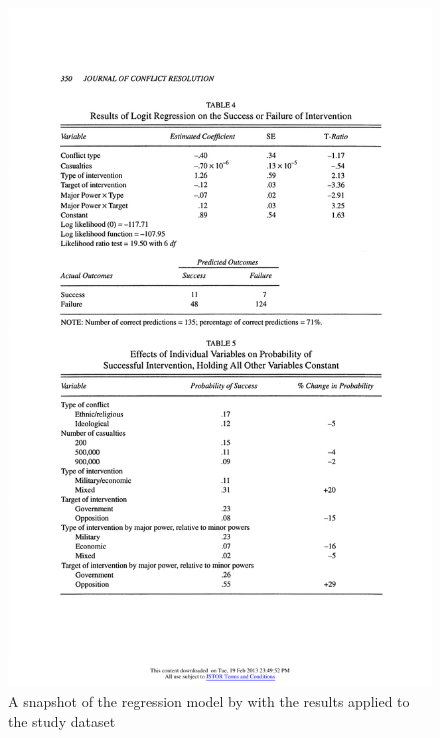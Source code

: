 \documentclass[letterpaper,12pt,titlepage,oneside,final]{book}
\begin{document}
\begin{center}
\begin{figure}[H]
\centering
\includegraphics[scale=1]{PDF-IMG/Regan_snap.pdf}

\caption{A snapshot of the regression model by \citet{regan1996} with the results applied to the study dataset}

\label{fig:regansnap}
\end{figure}
\end{center}
\end{document}
